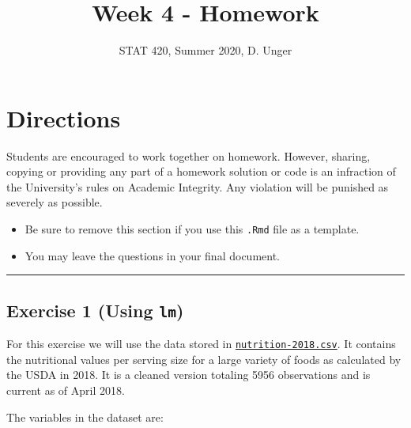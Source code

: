 \documentclass[
]{article}
\title{Week 4 - Homework}
\author{STAT 420, Summer 2020, D. Unger}
\date{}
\providecommand{\tightlist}{%
  \setlength{\itemsep}{0pt}\setlength{\parskip}{0pt}}
\begin{document}
\maketitle

\hypertarget{directions}{%
\section{Directions}\label{directions}}

Students are encouraged to work together on homework. However, sharing,
copying or providing any part of a homework solution or code is an
infraction of the University's rules on Academic Integrity. Any
violation will be punished as severely as possible.

\begin{itemize}
\tightlist
\item
  Be sure to remove this section if you use this \texttt{.Rmd} file as a
  template.
\item
  You may leave the questions in your final document.
\end{itemize}

\begin{center}\rule{0.5\linewidth}{0.5pt}\end{center}

\hypertarget{exercise-1-using-lm}{%
\subsection{\texorpdfstring{Exercise 1 (Using
\texttt{lm})}{Exercise 1 (Using lm)}}\label{exercise-1-using-lm}}

For this exercise we will use the data stored in
\href{nutrition-2018.csv}{\texttt{nutrition-2018.csv}}. It contains the
nutritional values per serving size for a large variety of foods as
calculated by the USDA in 2018. It is a cleaned version totaling 5956
observations and is current as of April 2018.

The variables in the dataset are:
\end{document}
